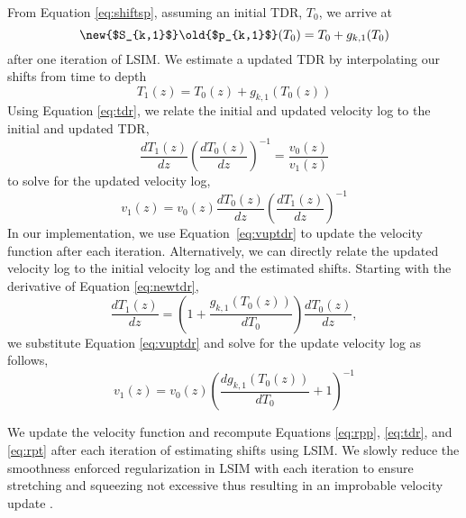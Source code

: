 From Equation \ref{eq:shiftsp}, assuming an initial TDR, $T_0$, we arrive at 
\begin{equation} \label{eq:break}
\text{\new{$S_{k,1}$}\old{$p_{k,1}$}}(T_0) = T_0 + g_{k,1}(T_0)
\end{equation}
after one iteration of LSIM. We estimate a updated TDR by interpolating our shifts from time to depth
\begin{equation} \label{eq:newtdr}
T_1(z) = T_0(z) + g_{k,1}(T_0(z))
\end{equation}
Using Equation \ref{eq:tdr}, we relate the initial and updated velocity log to the initial and updated TDR,
\begin{equation}
\frac{dT_1(z)}{dz}\left(\frac{dT_0(z)}{dz}\right)^{-1} = \frac{v_0(z)}{v_1(z)}
\end{equation}
to solve for the updated velocity log,
\begin{equation} \label{eq:vuptdr}
v_1(z) = v_0(z)\frac{dT_0(z)}{dz}\left(\frac{dT_1(z)}{dz}\right)^{-1}
\end{equation}
In our implementation, we use Equation~\ref{eq:vuptdr} to update the velocity function after each iteration. Alternatively, we can directly relate the updated velocity log to the initial velocity log and the estimated shifts. Starting with the derivative of Equation \ref{eq:newtdr},
\begin{equation}
\frac{dT_1(z)}{dz} = \left(1 + \frac{g_{k,1}(T_0(z))}{dT_0}\right)\frac{dT_0(z)}{dz},
\end{equation}
we substitute Equation \ref{eq:vuptdr} and solve for the update velocity log as follows,
\begin{equation}
v_1(z) = v_0(z)\left(\frac{dg_{k,1}(T_0(z))}{dT_0} + 1\right)^{-1}
\end{equation}

We update the velocity function and recompute Equations \ref{eq:rpp}, \ref{eq:tdr}, and \ref{eq:rpt} after each iteration of estimating shifts using LSIM. We slowly reduce the smoothness enforced  regularization in LSIM with each iteration to ensure  stretching and squeezing  not excessive thus resulting in an improbable velocity update \cite[]{whitesimm2003}.

